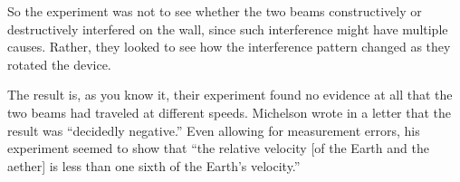 \documentclass[../../../main.tex]{subfiles}
\begin{document}
So the experiment was not to see whether the two beams constructively or destructively interfered on the wall, since such interference might have multiple causes. Rather, they looked to see how the interference pattern changed as they rotated the device. 

The result is, as you know it, their experiment found no evidence at all that the two beams had traveled at different speeds.  Michelson wrote in a letter that the result was “decidedly negative.” Even allowing for measurement errors, his experiment seemed to show that “the relative velocity [of the Earth and the aether] is less than one sixth of the Earth's velocity.”
\end{document}

